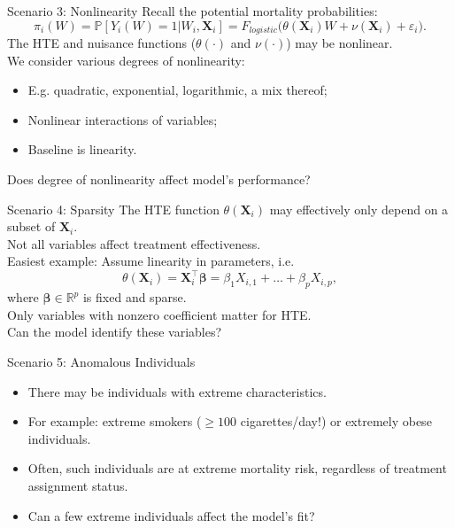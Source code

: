 \documentclass[11pt]{beamer}
\newcommand{\X}{\mathbf{X}}
\renewcommand{\P}{\mathbb{P}}
\begin{document}
\begin{frame}{Scenario 3: Nonlinearity}
Recall the potential mortality probabilities:
\[
\pi_i(W) = \P[Y_i(W)=1 | W_i, \X_i] = F_{logistic}\Bigg( \theta(\X_i)W +  \nu (\X_i) + \varepsilon_i \Bigg).
\]
The HTE and nuisance functions ($\theta(\cdot)$ and $\nu(\cdot)$) may be nonlinear.\medskip \\ 
We consider various degrees of nonlinearity:\medskip
\begin{itemize}\setlength\itemsep{1em}
	\item E.g. quadratic, exponential, logarithmic, a mix thereof;
	\item Nonlinear interactions of variables;
	\item Baseline is linearity.\bigskip
\end{itemize}

\textcolor{emc-darkblue}{} \alert{Does degree of nonlinearity affect model's performance?}
\end{frame}


\begin{frame}{Scenario 4: Sparsity}
The HTE function $\theta(\X_i)$ may effectively only depend on a subset of $\X_i$.\\
\textcolor{emc-darkblue}{} Not all variables affect treatment effectiveness. \bigskip\\
Easiest example: Assume linearity in parameters, i.e.
\[
	\theta(\X_i) = \X_i^\top \bm{\beta} = \beta_1X_{i,1} + \dots + \beta_pX_{i,p},
\] 
where $\bm{\beta} \in \mathbb{R}^p$ is fixed and sparse. \\ \bigskip
\textcolor{emc-darkblue}{} Only variables with nonzero coefficient matter for HTE.\\
\textcolor{emc-darkblue}{} \alert{Can the model identify these variables?}
\end{frame}


\begin{frame}{Scenario 5: Anomalous Individuals}
\begin{itemize}\setlength\itemsep{1em}
\item There may be individuals with extreme characteristics.
\item For example: extreme smokers ($\geq100$ cigarettes/day!) or extremely obese individuals.
\item Often, such individuals are at extreme mortality risk, regardless of treatment assignment status.
\item[\ding{212}] \alert{Can a few extreme individuals affect the model's fit?}
\end{itemize}

\end{frame}
\end{document}
